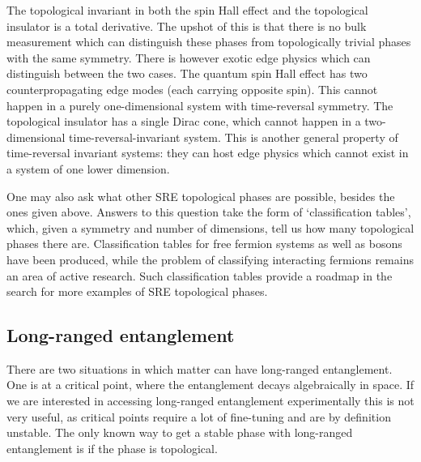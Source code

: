 The topological invariant in both the spin Hall effect and the topological insulator is a total derivative. The upshot of this is that there is no bulk measurement which can distinguish these phases from topologically trivial phases with the same symmetry. There is however exotic edge physics which can distinguish between the two cases. The quantum spin Hall effect has two counterpropagating edge modes (each carrying opposite spin). This cannot happen in a purely one-dimensional system with time-reversal symmetry. The topological insulator has a single Dirac cone, which cannot happen in a two-dimensional time-reversal-invariant system. This is another general property of time-reversal invariant systems: they can host edge physics which cannot exist in a system of one lower dimension.

One may also ask what other SRE topological phases are possible, besides the ones given above. Answers to this question take the form of `classification tables', which, given a symmetry and number of dimensions, tell us how many topological phases there are. Classification tables for free fermion systems\cite{KitaevTable,Ludwig} as well as bosons\cite{WenScience,*WenPRB} have been produced, while the problem of classifying interacting fermions remains an area of active research. Such classification tables provide a roadmap in the search for more examples of SRE topological phases.

\subsection{Long-ranged entanglement}

There are two situations in which matter can have long-ranged entanglement. One is at a critical point, where the entanglement decays algebraically in space. If we are interested in accessing long-ranged entanglement experimentally this is not very useful, as critical points require a lot of fine-tuning and are by definition unstable. The only known way to get a stable phase with long-ranged entanglement is if the phase is topological. 

